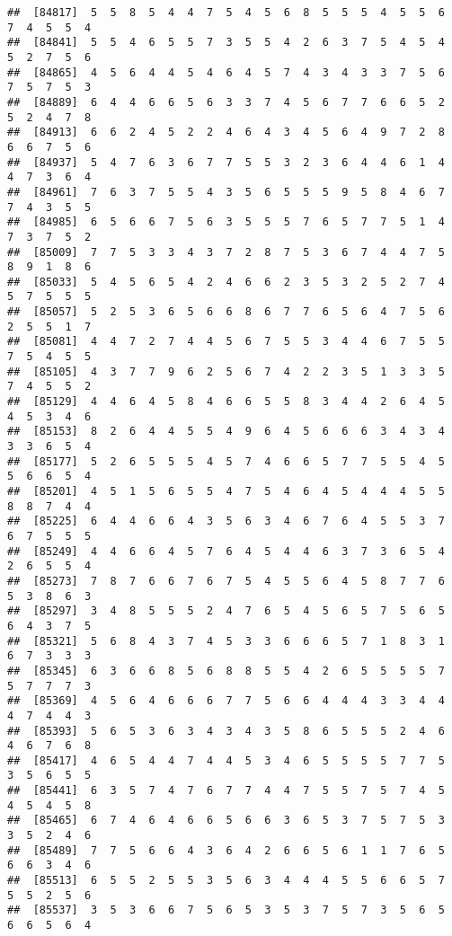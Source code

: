 \documentclass[
]{book}
\begin{document}
\begin{verbatim}
##  [84817]  5  5  8  5  4  4  7  5  4  5  6  8  5  5  5  4  5  5  6  7  4  5  5  4
##  [84841]  5  5  4  6  5  5  7  3  5  5  4  2  6  3  7  5  4  5  4  5  2  7  5  6
##  [84865]  4  5  6  4  4  5  4  6  4  5  7  4  3  4  3  3  7  5  6  7  5  7  5  3
##  [84889]  6  4  4  6  6  5  6  3  3  7  4  5  6  7  7  6  6  5  2  5  2  4  7  8
##  [84913]  6  6  2  4  5  2  2  4  6  4  3  4  5  6  4  9  7  2  8  6  6  7  5  6
##  [84937]  5  4  7  6  3  6  7  7  5  5  3  2  3  6  4  4  6  1  4  4  7  3  6  4
##  [84961]  7  6  3  7  5  5  4  3  5  6  5  5  5  9  5  8  4  6  7  7  4  3  5  5
##  [84985]  6  5  6  6  7  5  6  3  5  5  5  7  6  5  7  7  5  1  4  7  3  7  5  2
##  [85009]  7  7  5  3  3  4  3  7  2  8  7  5  3  6  7  4  4  7  5  8  9  1  8  6
##  [85033]  5  4  5  6  5  4  2  4  6  6  2  3  5  3  2  5  2  7  4  5  7  5  5  5
##  [85057]  5  2  5  3  6  5  6  6  8  6  7  7  6  5  6  4  7  5  6  2  5  5  1  7
##  [85081]  4  4  7  2  7  4  4  5  6  7  5  5  3  4  4  6  7  5  5  7  5  4  5  5
##  [85105]  4  3  7  7  9  6  2  5  6  7  4  2  2  3  5  1  3  3  5  7  4  5  5  2
##  [85129]  4  4  6  4  5  8  4  6  6  5  5  8  3  4  4  2  6  4  5  4  5  3  4  6
##  [85153]  8  2  6  4  4  5  5  4  9  6  4  5  6  6  6  3  4  3  4  3  3  6  5  4
##  [85177]  5  2  6  5  5  5  4  5  7  4  6  6  5  7  7  5  5  4  5  5  6  6  5  4
##  [85201]  4  5  1  5  6  5  5  4  7  5  4  6  4  5  4  4  4  5  5  8  8  7  4  4
##  [85225]  6  4  4  6  6  4  3  5  6  3  4  6  7  6  4  5  5  3  7  6  7  5  5  5
##  [85249]  4  4  6  6  4  5  7  6  4  5  4  4  6  3  7  3  6  5  4  2  6  5  5  4
##  [85273]  7  8  7  6  6  7  6  7  5  4  5  5  6  4  5  8  7  7  6  5  3  8  6  3
##  [85297]  3  4  8  5  5  5  2  4  7  6  5  4  5  6  5  7  5  6  5  6  4  3  7  5
##  [85321]  5  6  8  4  3  7  4  5  3  3  6  6  6  5  7  1  8  3  1  6  7  3  3  3
##  [85345]  6  3  6  6  8  5  6  8  8  5  5  4  2  6  5  5  5  5  7  5  7  7  7  3
##  [85369]  4  5  6  4  6  6  6  7  7  5  6  6  4  4  4  3  3  4  4  4  7  4  4  3
##  [85393]  5  6  5  3  6  3  4  3  4  3  5  8  6  5  5  5  2  4  6  4  6  7  6  8
##  [85417]  4  6  5  4  4  7  4  4  5  3  4  6  5  5  5  5  7  7  5  3  5  6  5  5
##  [85441]  6  3  5  7  4  7  6  7  7  4  4  7  5  5  7  5  7  4  5  4  5  4  5  8
##  [85465]  6  7  4  6  4  6  6  5  6  6  3  6  5  3  7  5  7  5  3  3  5  2  4  6
##  [85489]  7  7  5  6  6  4  3  6  4  2  6  6  5  6  1  1  7  6  5  6  6  3  4  6
##  [85513]  6  5  5  2  5  5  3  5  6  3  4  4  4  5  5  6  6  5  7  5  5  2  5  6
##  [85537]  3  5  3  6  6  7  5  6  5  3  5  3  7  5  7  3  5  6  5  6  6  5  6  4

\end{verbatim}
\end{document}
